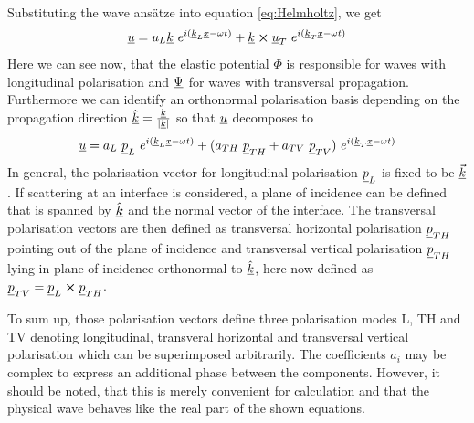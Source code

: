 Substituting the wave ansätze into equation \ref{eq:Helmholtz}, we get
\begin{equation}
    \uline{u} = u_L \uline{k}\	e^{i(\uline{k}_L\uline{x}-\omega t)}
    + \uline{k} \cross \uline{u}_T\ e^{i(\uline{k}_T\uline{x}-\omega t)}
\end{equation}
Here we can see now, that the elastic potential $\Phi$ is responsible for waves
with longitudinal polarisation and $\underline{\Psi}$ for waves with transversal
propagation. Furthermore we can identify an orthonormal polarisation basis
depending on the propagation direction $\underline{\hat{k}} =
    \frac{\underline{k}}{|\underline{k}|}$ so that $\underline{u}$ decomposes to
\begin{equation} \label{eq:wave_ansatz}
    \uline{u} = a_L \ \uline{p}_L\	e^{i(\uline{k}_L\uline{x}-\omega
            t)}
    + (a_{TH}\ \uline{p}_{TH} + a_{TV}\ \uline{p}_{TV})\
    e^{i(\uline{k}_T\uline{x}-\omega t)}
\end{equation}
In general, the polarisation vector for longitudinal polarisation
$\underline{p}_L$ is fixed to be $\underline{\vec{k}}$. If scattering at an interface
is considered, a plane of incidence can be defined that is spanned by
$\underline{\hat{k}}$ and the normal vector of the interface. The transversal
polarisation vectors are then defined as transversal horizontal polarisation
$\underline{p}_{TH}$ pointing out of the plane of incidence and transversal
vertical polarisation $\underline{p}_{TH}$ lying in plane of incidence orthonormal
to $\underline{\hat{k}}$, here now defined as
$\underline{p}_{TV}=\underline{p}_L \cross \underline{p}_{TH}$.
\todo{sketch}

To sum up, those polarisation vectors define three polarisation modes L, TH and
TV denoting longitudinal, transveral horizontal and transversal vertical
polarisation which can be superimposed arbitrarily. The coefficients $a_i$ may
be complex to express an additional phase between the components. However, it
should be noted, that this is merely convenient for
calculation and that the physical wave behaves like the real part of the shown
equations.


